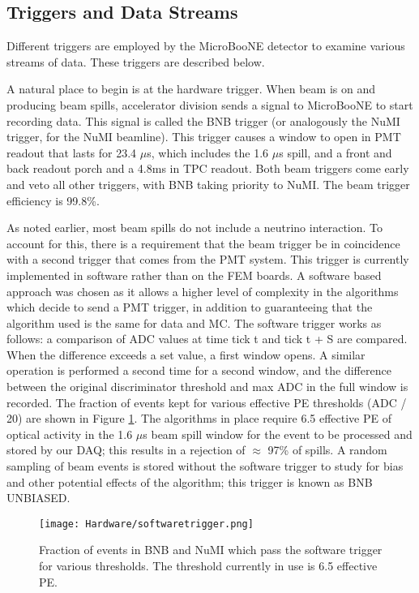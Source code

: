 \subsection{Triggers and Data Streams}
\par Different triggers are employed by the MicroBooNE detector to examine various streams of data. These triggers are described below.
\par A natural place to begin is at the hardware trigger.  When beam is on and producing beam spills, accelerator division sends a signal to MicroBooNE to start recording data. This signal is called the BNB trigger (or analogously the NuMI trigger, for the NuMI beamline).  This trigger causes a window to open in PMT readout that lasts for 23.4 $\mu$s, which includes the 1.6 $\mu$s spill, and a front and back readout porch and a 4.8ms in TPC readout.  Both beam triggers come early and veto all other triggers, with BNB taking priority to NuMI.  The beam trigger efficiency is 99.8\%. %
\par As noted earlier, most beam spills do not include a neutrino interaction. To account for this, there is a requirement that the beam trigger be in coincidence with a second trigger that comes from the PMT system. This trigger is currently implemented in software rather than on the FEM boards.  A software based approach was chosen as it allows a higher level of complexity in the algorithms which decide to send a PMT trigger, in addition to guaranteeing that the algorithm used is the same for data and MC.  The software trigger works as follows: a comparison of ADC values at time tick t and tick t + S are compared.  When the difference exceeds a set value, a first window opens. A similar operation is performed a second time for a second window, and the difference between the original discriminator threshold and max ADC in the full window is recorded. The fraction of events kept for various effective PE thresholds (ADC / 20) are shown in Figure \ref{fig:swtrigger}.  The algorithms in place require 6.5 effective PE of optical activity in the 1.6 $\mu$s beam spill window for the event to be processed and stored by our DAQ; this results in a rejection of $\approx$ 97\% of spills. A random sampling of beam events is stored without the software trigger to study for bias and other potential effects of the algorithm; this trigger is known as BNB UNBIASED. 

\begin{figure}[h!]
\centering
\texttt{[image: Hardware/softwaretrigger.png]}
\caption{ Fraction of events in BNB and NuMI which pass the software trigger for various thresholds. The threshold currently in use is 6.5 effective PE.  } 
\label{fig:swtrigger}
\end{figure}

